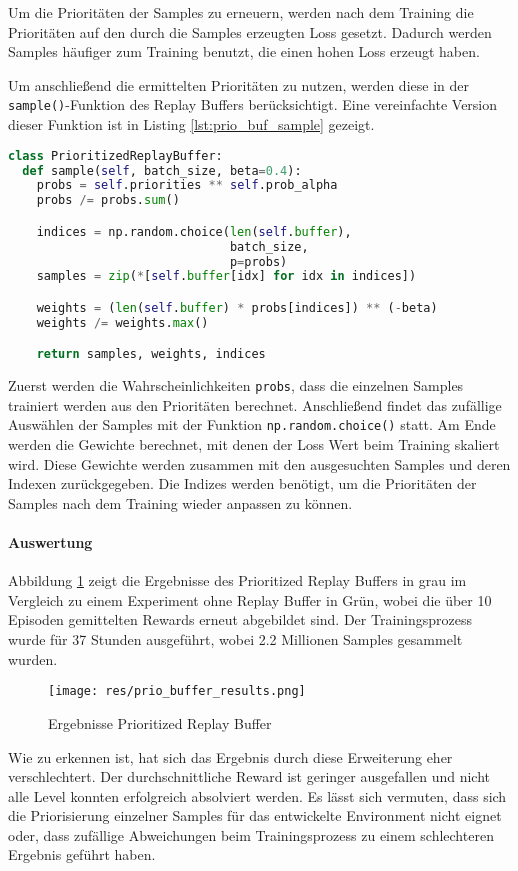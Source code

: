 \documentclass[11pt]{scrartcl}
\begin{document}
Um die Prioritäten der Samples zu erneuern, werden nach dem Training die Prioritäten auf
den durch die Samples erzeugten Loss gesetzt. Dadurch werden Samples häufiger zum
Training benutzt, die einen hohen Loss erzeugt haben.

Um anschließend die ermittelten Prioritäten zu nutzen, werden diese in der
\lstinline!sample()!-Funktion des Replay Buffers berücksichtigt. Eine vereinfachte Version
dieser Funktion ist in Listing \ref{lst:prio_buf_sample} gezeigt.
\begin{lstlisting}[language=Python, caption=sample()-Funktion des PrioritizedReplayBuffers,
label=lst:prio_buf_sample]
class PrioritizedReplayBuffer:
  def sample(self, batch_size, beta=0.4):
    probs = self.priorities ** self.prob_alpha
    probs /= probs.sum()

    indices = np.random.choice(len(self.buffer),
                               batch_size,
                               p=probs)
    samples = zip(*[self.buffer[idx] for idx in indices])

    weights = (len(self.buffer) * probs[indices]) ** (-beta)
    weights /= weights.max()

    return samples, weights, indices
\end{lstlisting}
\noindent
Zuerst werden die Wahrscheinlichkeiten \lstinline!probs!, dass die einzelnen Samples
trainiert werden aus den Prioritäten berechnet. Anschließend findet das zufällige
Auswählen der Samples mit der Funktion \lstinline!np.random.choice()! statt. Am Ende
werden die Gewichte berechnet, mit denen der Loss Wert beim Training skaliert wird. Diese
Gewichte werden zusammen mit den ausgesuchten Samples und deren Indexen zurückgegeben.
Die Indizes werden benötigt, um die Prioritäten der Samples nach dem Training wieder
anpassen zu können.

\paragraph*{Auswertung}
Abbildung \ref{fig:prio_buf_results} zeigt die Ergebnisse des Prioritized Replay Buffers
in grau im Vergleich zu einem Experiment ohne Replay Buffer in Grün, wobei die über 10
Episoden gemittelten Rewards erneut abgebildet sind. Der Trainingsprozess wurde für 37
Stunden ausgeführt, wobei 2.2 Millionen Samples gesammelt wurden.
\begin{figure}[htp]
\centering
\texttt{[image: res/prio\_buffer\_results.png]}
\caption{Ergebnisse Prioritized Replay Buffer}
\label{fig:prio_buf_results}
\end{figure}
\noindent
Wie zu erkennen ist, hat sich das Ergebnis durch diese Erweiterung eher verschlechtert.
Der durchschnittliche Reward ist geringer ausgefallen und nicht alle Level konnten
erfolgreich absolviert werden. Es lässt sich vermuten, dass sich die Priorisierung
einzelner Samples für das entwickelte Environment nicht eignet oder, dass zufällige
Abweichungen beim Trainingsprozess zu einem schlechteren Ergebnis geführt haben.
\end{document}
